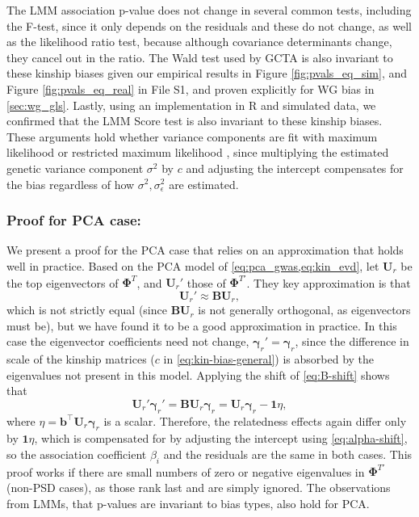\documentclass[9pt,twocolumn,twoside]{gsajnl}
\newcommand{\kinMat}[1][T]{\mathbf{\Phi}^{#1}}
\newcommand{\kinMatPrime}{\mathbf{\Phi}^{T\prime}}
\begin{document}
The LMM association p-value does not change in several common tests, including the F-test, since it only depends on the residuals and these do not change, as well as the likelihood ratio test, because although covariance determinants change, they cancel out in the ratio.
The Wald test used by GCTA \citep{yang_advantages_2014} is also invariant to these kinship biases given our empirical results in Figure \ref{fig:pvals_eq_sim}, and Figure \ref*{fig:pvals_eq_real} in File S1, and proven explicitly for WG bias in \cref{sec:wg_gls}.
Lastly, using an implementation in R and simulated data, we confirmed that the LMM Score test is also invariant to these kinship biases.
These arguments hold whether variance components are fit with maximum likelihood or restricted maximum likelihood \citep{kang_efficient_2008, kang_variance_2010, yang_advantages_2014}, since multiplying the estimated genetic variance component $\sigma^2$ by $c$ and adjusting the intercept compensates for the bias regardless of how $\sigma^2, \sigma^2_\epsilon$ are estimated.

\subsubsection{Proof for PCA case:}

We present a proof for the PCA case that relies on an approximation that holds well in practice.
Based on the PCA model of \cref{eq:pca_gwas,eq:kin_evd}, let $\mathbf{U}_r$ be the top eigenvectors of $\kinMat$, and $\mathbf{U}_r'$ those of $\kinMatPrime$.
They key approximation is that
\begin{equation}
  \label{eq:pc-shift}
  \mathbf{U}_r' \approx \mathbf{B} \mathbf{U}_r,
\end{equation}
which is not strictly equal (since $\mathbf{B} \mathbf{U}_r$ is not generally orthogonal, as eigenvectors must be), but we have found it to be a good approximation in practice.
In this case the eigenvector coefficients need not change, $\boldsymbol{\gamma}_r' = \boldsymbol{\gamma}_r$, since the difference in scale of the kinship matrices ($c$ in \cref{eq:kin-bias-general}) is absorbed by the eigenvalues not present in this model.
Applying the shift of \cref{eq:B-shift} shows that
$$
\mathbf{U}_r' \boldsymbol{\gamma}_r'
=
\mathbf{B} \mathbf{U}_r \boldsymbol{\gamma}_r
=
\mathbf{U}_r \boldsymbol{\gamma}_r - \mathbf{1} \eta,
$$
where
$\eta = \mathbf{b}^\intercal \mathbf{U}_r \boldsymbol{\gamma}_r$
is a scalar.
Therefore, the relatedness effects again differ only by $\mathbf{1} \eta$, which is compensated for by adjusting the intercept using \cref{eq:alpha-shift}, so the association coefficient $\beta_i$ and the residuals are the same in both cases.
This proof works if there are small numbers of zero or negative eigenvalues in $\kinMatPrime$ (non-PSD cases), as those rank last and are simply ignored.
The observations from LMMs, that p-values are invariant to bias types, also hold for PCA.
\end{document}
